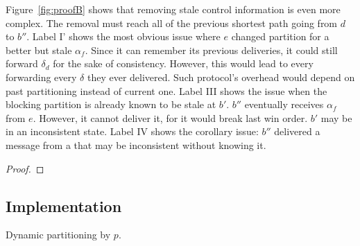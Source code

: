 \noindent Figure~\ref{fig:proofB} shows that removing stale control
information is even more complex. The removal must reach all \processes
of the previous shortest path going from $d$ to $b''$. Label I' shows
the most obvious issue where \Process $e$ changed partition for a
better but stale $\alpha_f$. Since it can remember its previous
deliveries, it could still forward $\delta_d$ for the sake of
consistency. However, this would lead to every \process forwarding
every $\delta$ they ever delivered. Such protocol's overhead would
depend on past partitioning instead of current one. Label III shows
the issue when the blocking partition is already known to be stale at
\Process $b'$. \Process $b''$ eventually receives $\alpha_f$ from
$e$. However, it cannot deliver it, for it would break last win order.
\Process $b'$ may be in an inconsistent state. Label IV shows the
corollary issue: \Process $b''$ delivered a message from a \process that
may be inconsistent without knowing it.


\begin{theorem}
\end{theorem}

\begin{proof}
\end{proof}



\subsection{Implementation}

\begin{algorithm}
  
  \caption{\label{algo:adddelundo}Dynamic partitioning by \Process $p$.}
\end{algorithm}

